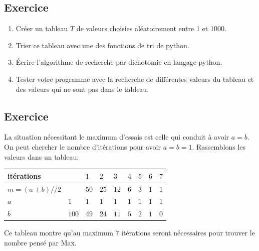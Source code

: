 \documentclass[11pt,a4paper]{article}
\newcounter{num}
\newcounter{rem}
\newcounter{numexo}
\begin{document}
\addtocounter{numexo}{1}
\subsection*{\Large Exercice \thenumexo}
\begin{enumerate}
\item Créer un tableau $T$ de valeurs choisies aléatoirement entre 1 et 1000.
\item Trier ce tableau avec une des fonctions de tri de python.
\item Écrire l'algorithme de recherche par dichotomie en langage python.
\item Tester votre programme avec la recherche de différentes valeurs du tableau et des valeurs qui ne sont pas dans le tableau.
\end{enumerate}

\newpage

\setcounter{numexo}{0}
\addtocounter{numexo}{1}
\subsection*{\Large Exercice \thenumexo}
La situation nécessitant le maximum d'essais est celle qui conduit à avoir $a=b$. On peut chercher le nombre d'itérations pour avoir $a=b=1$. Rassemblons les valeurs dans un tableau:\medskip

\begin{tabular}{|C{2.5cm}*{8}{|C{1cm}}|}
    \hline
    itérations& & $1$ & $2$ & $3$ & $4$ & $5$ & $6$ & $7$ \\
    \hline
    $m=(a+b)//2$&&$50$&$25$&$12$&$6$&$3$&$1$&$1$\\
    \hline
    $a$&$1$&$1$&$1$&$1$&$1$&$1$&$1$&$1$\\
    \hline
    $b$&$100$&$49$&$24$&$11$&$5$&$2$&$1$&$0$\\
    \hline
\end{tabular}\medskip

Ce tableau montre qu'au maximum 7 itérations seront nécessaires pour trouver le nombre pensé par Max.

\addtocounter{numexo}{1}
\end{document}
